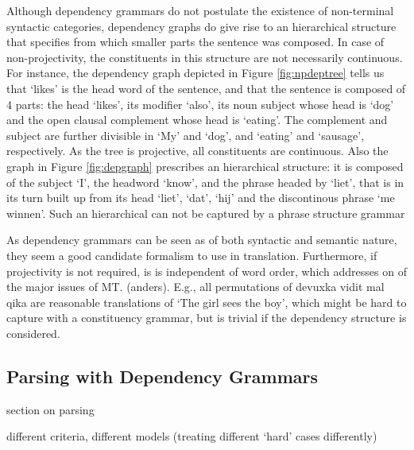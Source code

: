 \documentclass{report}
\newcommand\textcyr[1]{{\fontencoding{OT2}\fontfamily{wncyr}\selectfont #1}}
\theoremstyle{definition}
\theoremstyle{plain}
\begin{document}
Although dependency grammars do not postulate the existence of non-terminal syntactic categories, dependency graphs do give rise to an hierarchical structure that specifies from which smaller parts the sentence was composed. In case of non-projectivity, the constituents in this structure are not necessarily continuous. For instance, the dependency graph depicted in Figure \ref{fig:npdeptree} tells us that `likes' is the head word of the sentence, and that the sentence is composed of 4 parts: the head `likes', its modifier `also', its noun subject whose head is `dog' and the open clausal complement whose head is `eating'. The complement and subject are further divisible in `My' and `dog', and `eating' and `sausage', respectively. As the tree is projective, all constituents are continuous. Also the graph in Figure \ref{fig:depgraph} prescribes an hierarchical structure: it is composed of the subject `I', the headword `know', and the phrase headed by `liet', that is in its turn built up from its head `liet', `dat', `hij' and the discontinous phrase `me winnen'. Such an hierarchical can not be captured by a phrase structure grammar






As dependency grammars can be seen as of both syntactic and semantic nature, they seem a good candidate formalism to use in translation. Furthermore, if projectivity is not required, is is independent of word order, which addresses on of the major issues of MT. (anders). E.g., all permutations of \textcyr{devuxka vidit mal qika} are reasonable translations of `The girl sees the boy', which might be hard to capture with a constituency grammar, but is trivial if the dependency structure is considered.


\subsection{Parsing with Dependency Grammars}

section on parsing





different criteria, different models (treating different `hard' cases differently)



\end{document}
